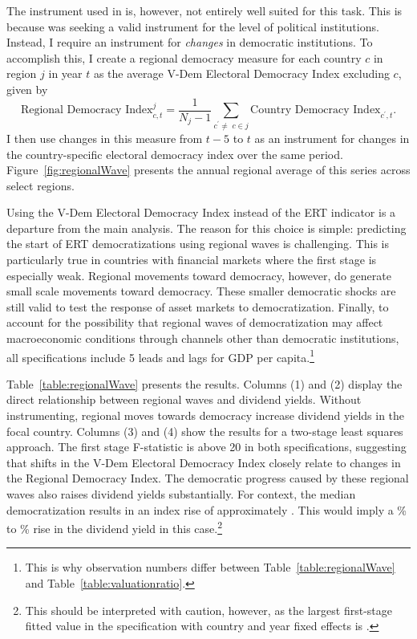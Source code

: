 \documentclass[12pt]{article}
\numberwithin{equation}{section}
\begin{document}
The instrument used in \cite{Acemoglu2019} is, however, not entirely well suited for this task. This is because \citeauthor{Acemoglu2019} was seeking a valid instrument for the level of political institutions. Instead, I require an instrument for {\it changes} in democratic institutions. To accomplish this, I create a regional democracy measure for each country $c$ in region $j$ in year $t$ as the average V-Dem Electoral Democracy Index excluding $c$, given by
\begin{equation}
\text{Regional Democracy Index}^j_{c,t} = \frac{1}{N_j-1}\sum_{c^\prime \neq \;c\in j}  \text{Country Democracy Index}_{c^\prime, t}.
\label{eq:reg_dem}
\end{equation}
I then use changes in this measure from $t-5$ to $t$ as an instrument for changes in the country-specific electoral democracy index over the same period. Figure~\ref{fig:regionalWave} presents the annual regional average of this series across select regions.

Using the V-Dem Electoral Democracy Index instead of the ERT indicator is a departure from the main analysis. The reason for this choice is simple: predicting the start of ERT democratizations using regional waves is challenging. This is particularly true in countries with financial markets where the first stage is especially weak. Regional movements toward democracy, however, do generate small scale movements toward democracy.  These smaller democratic shocks are still valid to test the response of asset markets to democratization. Finally, to account for the possibility that regional waves of democratization may affect macroeconomic conditions through channels other than democratic institutions, all specifications include 5 leads and lags for GDP per capita.\footnote{This is why observation numbers differ between Table~\ref{table:regionalWave} and Table~\ref{table:valuationratio}.}

Table~\ref{table:regionalWave} presents the results. Columns (1) and (2) display the direct relationship between regional waves and dividend yields. Without instrumenting, regional moves towards democracy increase dividend yields in the focal country. Columns (3) and (4) show the results for a two-stage least squares approach. The first stage F-statistic is above 20 in both specifications, suggesting that shifts in the V-Dem Electoral Democracy Index closely relate to changes in the Regional Democracy Index. The democratic progress caused by these regional waves also raises dividend yields substantially. For context, the median democratization results in an index rise of approximately \medianDemIndexChange. This would imply a \tabFiveIVLow\% to \tabFiveIVHigh\% rise in the dividend yield in this case.\footnote{This should be interpreted with caution, however, as the largest first-stage fitted value in the specification with country and year fixed effects is \tabFiveMaxFittedValue.}
\end{document}
